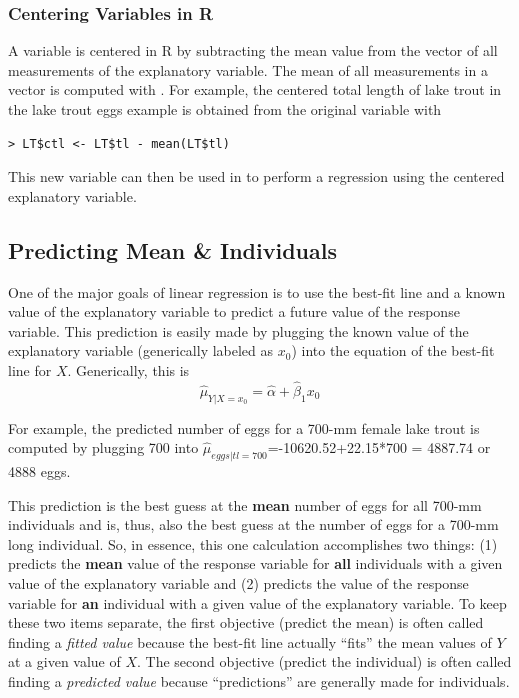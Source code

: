 \documentclass[10pt,openany]{book}\usepackage[]{graphicx}\usepackage[]{color}
\makeatletter
\newenvironment{kframe}{%
 \def\at@end@of@kframe{}%
 \ifinner\ifhmode%
  \def\at@end@of@kframe{\end{minipage}}%
  \begin{minipage}{\columnwidth}%
 \fi\fi%
 \def\FrameCommand##1{\hskip\@totalleftmargin \hskip-\fboxsep
 \colorbox{shadecolor}{##1}\hskip-\fboxsep
     \hskip-\linewidth \hskip-\@totalleftmargin \hskip\columnwidth}%
 \MakeFramed {\advance\hsize-\width
   \@totalleftmargin\z@ \linewidth\hsize
   \@setminipage}}%
 {\par\unskip\endMakeFramed%
 \at@end@of@kframe}
\newenvironment{knitrout}{}{} %
\makeatother
\begin{document}
\subsubsection*{Centering Variables in R}
A variable is centered in R by subtracting the mean value from the vector of all measurements of the explanatory variable.  The mean of all measurements in a vector is computed with .  For example, the centered total length of lake trout in the lake trout eggs example is obtained from the original  variable with

\begin{knitrout}
\color{fgcolor}\begin{kframe}
\begin{verbatim}
> LT$ctl <- LT$tl - mean(LT$tl)
\end{verbatim}
\end{kframe}
\end{knitrout}

This new variable can then be used in  to perform a regression using the centered explanatory variable.

\subsection{Predicting Mean \& Individuals}
One of the major goals of linear regression is to use the best-fit line and a known value of the explanatory variable to predict a future value of the response variable.  This prediction is easily made by plugging the known value of the explanatory variable (generically labeled as $x_{0}$) into the equation of the best-fit line for $X$.  Generically, this is
\[ \hat{\mu}_{Y|X=x_{0}} = \hat{\alpha} + \hat{\beta}_{1}x_{0} \]

For example, the predicted number of eggs for a 700-mm female lake trout is computed by plugging 700 into $\hat{\mu}_{eggs|tl=700}$=-10620.52+22.15*700 = 4887.74 or 4888 eggs.

This prediction is the best guess at the \textbf{mean} number of eggs for all 700-mm individuals and is, thus, also the best guess at the number of eggs for a 700-mm long individual.  So, in essence, this one calculation accomplishes two things: (1) predicts the \textbf{mean} value of the response variable for \textbf{all} individuals with a given value of the explanatory variable and (2) predicts the value of the response variable for \textbf{an} individual with a given value of the explanatory variable.  To keep these two items separate, the first objective (predict the mean) is often called finding a \emph{fitted value} because the best-fit line actually ``fits'' the mean values of $Y$ at a given value of $X$.  The second objective (predict the individual) is often called finding a \emph{predicted value} because ``predictions'' are generally made for individuals.
\end{document}
